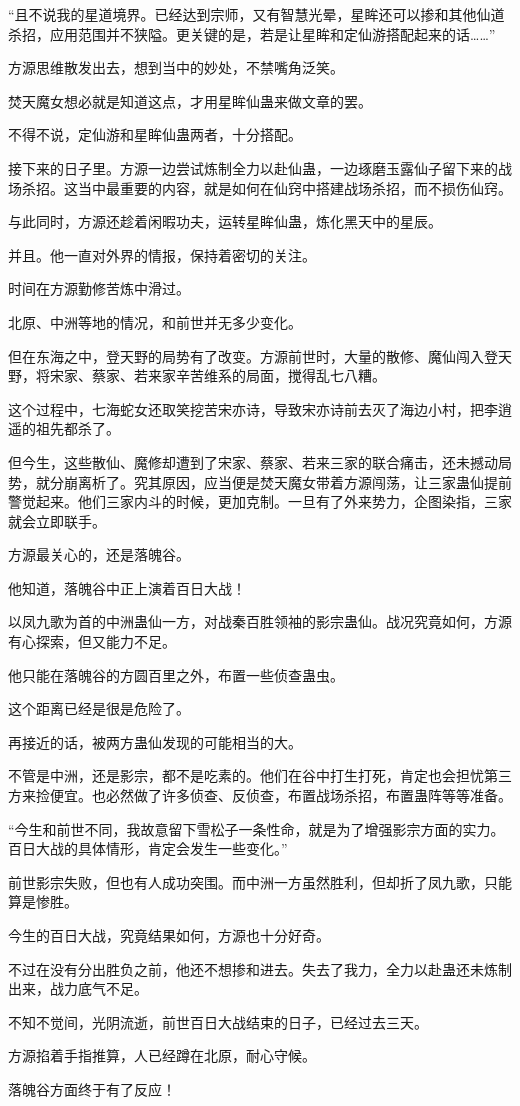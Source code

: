 \begin{this_body}
“且不说我的星道境界。已经达到宗师，又有智慧光晕，星眸还可以掺和其他仙道杀招，应用范围并不狭隘。更关键的是，若是让星眸和定仙游搭配起来的话……”

方源思维散发出去，想到当中的妙处，不禁嘴角泛笑。

焚天魔女想必就是知道这点，才用星眸仙蛊来做文章的罢。

不得不说，定仙游和星眸仙蛊两者，十分搭配。

接下来的日子里。方源一边尝试炼制全力以赴仙蛊，一边琢磨玉露仙子留下来的战场杀招。这当中最重要的内容，就是如何在仙窍中搭建战场杀招，而不损伤仙窍。

与此同时，方源还趁着闲暇功夫，运转星眸仙蛊，炼化黑天中的星辰。

并且。他一直对外界的情报，保持着密切的关注。

时间在方源勤修苦炼中滑过。

北原、中洲等地的情况，和前世并无多少变化。

但在东海之中，登天野的局势有了改变。方源前世时，大量的散修、魔仙闯入登天野，将宋家、蔡家、若来家辛苦维系的局面，搅得乱七八糟。

这个过程中，七海蛇女还取笑挖苦宋亦诗，导致宋亦诗前去灭了海边小村，把李逍遥的祖先都杀了。

但今生，这些散仙、魔修却遭到了宋家、蔡家、若来三家的联合痛击，还未撼动局势，就分崩离析了。究其原因，应当便是焚天魔女带着方源闯荡，让三家蛊仙提前警觉起来。他们三家内斗的时候，更加克制。一旦有了外来势力，企图染指，三家就会立即联手。

方源最关心的，还是落魄谷。

他知道，落魄谷中正上演着百日大战！

以凤九歌为首的中洲蛊仙一方，对战秦百胜领袖的影宗蛊仙。战况究竟如何，方源有心探索，但又能力不足。

他只能在落魄谷的方圆百里之外，布置一些侦查蛊虫。

这个距离已经是很是危险了。

再接近的话，被两方蛊仙发现的可能相当的大。

不管是中洲，还是影宗，都不是吃素的。他们在谷中打生打死，肯定也会担忧第三方来捡便宜。也必然做了许多侦查、反侦查，布置战场杀招，布置蛊阵等等准备。

“今生和前世不同，我故意留下雪松子一条性命，就是为了增强影宗方面的实力。百日大战的具体情形，肯定会发生一些变化。”

前世影宗失败，但也有人成功突围。而中洲一方虽然胜利，但却折了凤九歌，只能算是惨胜。

今生的百日大战，究竟结果如何，方源也十分好奇。

不过在没有分出胜负之前，他还不想掺和进去。失去了我力，全力以赴蛊还未炼制出来，战力底气不足。

不知不觉间，光阴流逝，前世百日大战结束的日子，已经过去三天。

方源掐着手指推算，人已经蹲在北原，耐心守候。

落魄谷方面终于有了反应！

\end{this_body}

